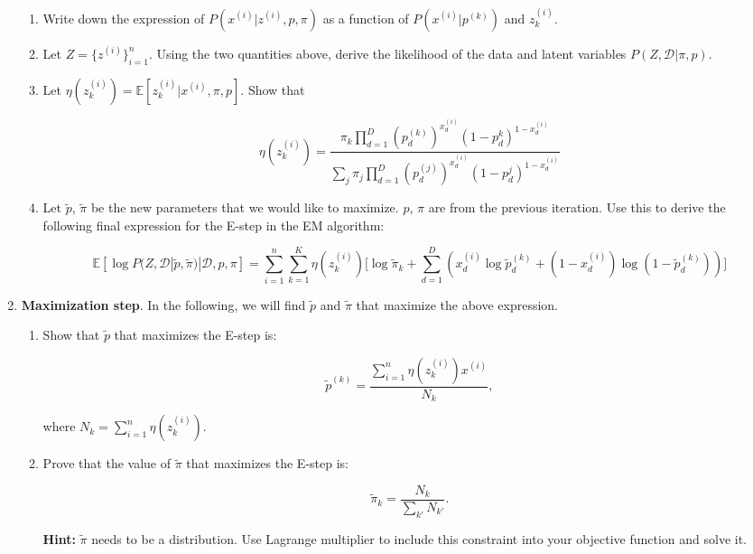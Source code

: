\begin{Q}
\begin{enumerate}
\begin{enumerate}
\item Write down the expression of $P(x^{(i)}| z^{(i)}, p, \pi  )$ as a function of $P(x^{(i)}|p^{(k)})$ and $z_{k}^{(i)}$.

\item Let $Z= \{ z^{(i)}\}_{i=1}^{n}$. Using the two quantities above, derive the likelihood of the data and latent variables $P(Z,\mathcal{D}|\pi, p)$.

\item Let $\eta(z_{k}^{(i)}) = \mathbb{E} [z_{k}^{(i)}| x^{(i)}, \pi, p  ]$. Show that 

$$
\eta(z_{k}^{(i)})  = \frac{\pi_{k}  \prod_{d=1}^{D} (p_{d}^{(k)})^{x_{d}^{(i)} } (1-p_{d}^{k})^{1-x_{d}^{(i)}}  }{ \sum_{j}  \pi_{j}  \prod_{d=1}^{D} (p_{d}^{(j)})^{x_{d}^{(i)} } (1-p_{d}^{j})^{1-x_{d}^{(i)}}   }
$$

\item Let $\tilde{p}$, $\tilde{\pi}$ be the new parameters that we would like to maximize. $p$, $\pi$ are from the previous iteration. Use this to derive the following final expression for the E-step in the EM algorithm:

$$
\mathbb{E}[\log P(Z, \mathcal{D} | \tilde{ p}, \tilde{\pi}  ) | \mathcal{D} , p, \pi    ] = \sum_{i=1}^{n} \sum_{k=1}^{K} \eta(z_{k}^{(i)}) \Big[ \log{\tilde{\pi}_{k} } + \sum_{d=1}^{D} (  x_{d}^{(i)} \log \tilde{p}_{d}^{(k)}+ (1-x_{d}^{(i)}) \log(1-  \tilde{p}_{d}^{(k)}  )  )   \Big]
$$
\end{enumerate}


\item  \textbf{Maximization step}. In the following, we will find $\tilde{p}$ and $\tilde{\pi}$ that maximize the above expression. 
\begin{enumerate}
\item Show that $\tilde{p}$ that maximizes the E-step is:

$$
\tilde{p}^{(k)} = \frac{  \sum_{i=1}^{n} \eta(z_{k}^{(i)} ) x^{(i)}   }{N_k},
$$

where $N_{k} = \sum_{i=1}^{n} \eta( z_{k}^{(i)} )$.

\item Prove that the value of $\tilde{\pi}$ that maximizes the E-step is:

$$
\tilde{\pi}_{k} = \frac{N_{k}}{ \sum_{k'} N_{k'} }.
$$

\textbf{Hint:} $\tilde{\pi}$ needs to be a distribution. Use Lagrange multiplier to include this constraint into your objective function and solve it.

\end{enumerate}

\end{enumerate}
\end{Q}
          